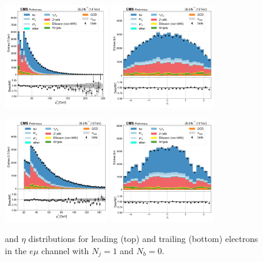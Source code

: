 \begin{figure}[htb!]
    \centering
    \includegraphics[width=0.4\textwidth]{chapters/Analysis/sectionPlots/figures/data_mc_overlays/emu_2016_cat_eq1_eq0_a_signal_linear_lepton_lepton1_pt}
    \includegraphics[width=0.4\textwidth]{chapters/Analysis/sectionPlots/figures/data_mc_overlays/emu_2016_cat_eq1_eq0_a_signal_linear_lepton_lepton1_eta}

    \includegraphics[width=0.4\textwidth]{chapters/Analysis/sectionPlots/figures/data_mc_overlays/emu_2016_cat_eq1_eq0_a_signal_linear_lepton_lepton2_pt}
    \includegraphics[width=0.4\textwidth]{chapters/Analysis/sectionPlots/figures/data_mc_overlays/emu_2016_cat_eq1_eq0_a_signal_linear_lepton_lepton2_eta}
    \caption{\pt and $\eta$ distributions for leading (top) and trailing
        (bottom) electrons in the $e\mu$ channel with $N_{j} = 1$ and
        $N_{b} = 0$.}
    \label{fig:analysis:plots:emu_2_kinematic}
\end{figure}

